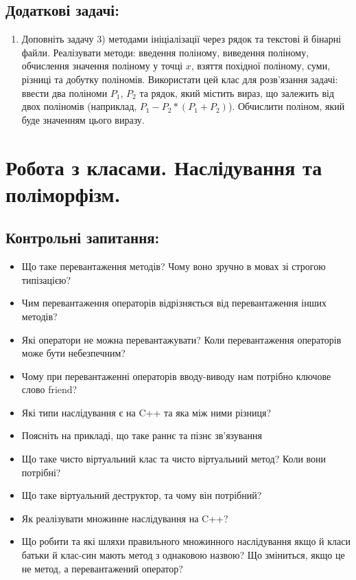 \documentclass[a5paper,titlepage,openany,twoside,draft]{book_unv}%
\begin{document}
\section{Додаткові задачі:}

\begin{enumerate}
\def\labelenumi{\arabic{enumi})}
\setcounter{enumi}{18}
\item
Доповніть задачу 3) методами ініціалізації через рядок та текстові й бінарні файли.
Реалізувати методи: введення поліному, виведення поліному, обчислення
значення поліному у точці $x$, взяття похідної поліному, суми, різниці та
добутку поліномів. Використати цей клас для розв'язання задачі: ввести два
поліноми $P_1$, $P_2$ та рядок, який містить вираз, що залежить від двох
поліномів (наприклад, $P_1 - P_2*(P_1 + P_2) $). Обчислити поліном, який буде значенням цього виразу.

\end{enumerate}


\chapter{Робота з класами. Наслідування та поліморфізм.}
%

\section{Контрольні запитання:}
\begin{itemize}
\item
  Що таке перевантаження методів? Чому воно зручно в мовах зі строгою
  типізацією?
\item
  Чим перевантаження операторів відрізняється від перевантаження інших
  методів?
\item
  Які оператори не можна перевантажувати? Коли перевантаження операторів
  може бути небезпечним?
\item
  Чому при перевантаженні операторів вводу-виводу нам потрібно ключове
  слово friend?
\item
  Які типи наслідування є на C++ та яка між ними різниця?
\item
  Поясніть на прикладі, що таке раннє та пізнє зв'язування
\item
  Що таке чисто віртуальний клас та чисто віртуальний метод? Коли вони
  потрібні?
\item
  Що таке віртуальний деструктор, та чому він потрібний?
\item
  Як реалізувати множинне наслідування на C++?
\item
  Що робити та які шляхи правильного множинного наслідування якщо й
  класи батьки й клас-син мають метод з однаковою назвою? Що зміниться,
  якщо це не метод, а перевантажений оператор?
\end{itemize}
\end{document}
